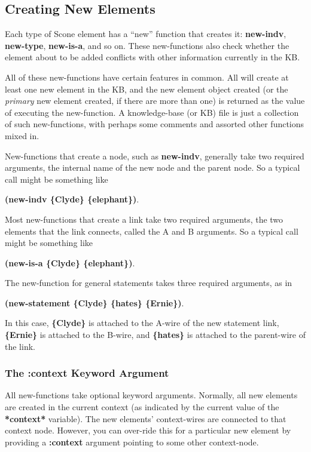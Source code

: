 \documentclass[titlepage,twoside,openright,11pt]{article}
\begin{document}
\subsection{Creating New Elements}\label{creating-new-elements}

Each type of Scone element has a ``new'' function that creates it:
\textbf{new-indv}, \textbf{new-type}, \textbf{new-is-a}, and so on.
These new-functions also check whether the element about to be added
conflicts with other information currently in the KB.

All of these new-functions have certain features in common. All will
create at least one new element in the KB, and the new element object
created (or the \emph{primary} new element created, if there are more
than one) is returned as the value of executing the new-function. A
knowledge-base (or KB) file is just a collection of such new-functions,
with perhaps some comments and assorted other functions mixed in.

New-functions that create a node, such as \textbf{new-indv}, generally
take two required arguments, the internal name of the new node and the
parent node. So a typical call might be something like

\textbf{(new-indv \{Clyde\} \{elephant\})}.

Most new-functions that create a link take two required arguments, the
two elements that the link connects, called the A and B arguments. So a
typical call might be something like

\textbf{(new-is-a \{Clyde\} \{elephant\})}.

The new-function for general statements takes three required arguments,
as in

\textbf{(new-statement \{Clyde\} \{hates\} \{Ernie\})}.

In this case, \textbf{\{Clyde\}} is attached to the A-wire of the new
statement link, \textbf{\{Ernie\}} is attached to the B-wire, and
\textbf{\{hates\}} is attached to the parent-wire of the link.

\subsubsection{The :context Keyword
Argument}\label{the-context-keyword-argument}

All new-functions take optional keyword arguments. Normally, all new
elements are created in the current context (as indicated by the current
value of the \textbf{*context*} variable). The new elements'
context-wires are connected to that context node. However, you can
over-ride this for a particular new element by providing a
\textbf{:context} argument pointing to some other context-node.
\end{document}
